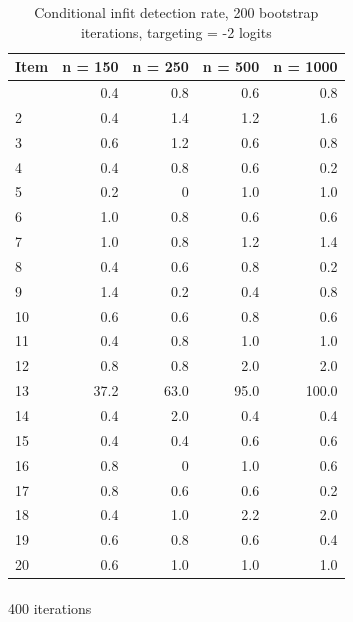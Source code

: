 \documentclass[
  letterpaper,
  DIV=11,
  numbers=noendperiod]{scrartcl}
\makeatletter
\let\oldparagraph\paragraph
\renewcommand{\paragraph}{
    \@ifstar
      \xxxParagraphStar
      \xxxParagraphNoStar
  }
\newcommand{\xxxParagraphStar}[1]{\oldparagraph*{#1}\mbox{}}
\newcommand{\xxxParagraphNoStar}[1]{\oldparagraph{#1}\mbox{}}
\makeatother
\begin{document}
\begin{longtable}[]{@{}lrrrr@{}}

\caption{\label{tbl-ifbresults2002}Conditional infit detection rate, 200
bootstrap iterations, targeting = -2 logits}

\tabularnewline

\toprule\noalign{}
Item & n = 150 & n = 250 & n = 500 & n = 1000 \\
\midrule\noalign{}
\endhead
\bottomrule\noalign{}
\endlastfoot
1 & 0.4 & 0.8 & 0.6 & 0.8 \\
2 & 0.4 & 1.4 & 1.2 & 1.6 \\
3 & 0.6 & 1.2 & 0.6 & 0.8 \\
4 & 0.4 & 0.8 & 0.6 & 0.2 \\
5 & 0.2 & 0 & 1.0 & 1.0 \\
6 & 1.0 & 0.8 & 0.6 & 0.6 \\
7 & 1.0 & 0.8 & 1.2 & 1.4 \\
8 & 0.4 & 0.6 & 0.8 & 0.2 \\
9 & 1.4 & 0.2 & 0.4 & 0.8 \\
10 & 0.6 & 0.6 & 0.8 & 0.6 \\
11 & 0.4 & 0.8 & 1.0 & 1.0 \\
12 & 0.8 & 0.8 & 2.0 & 2.0 \\
13 & 37.2 & 63.0 & 95.0 & 100.0 \\
14 & 0.4 & 2.0 & 0.4 & 0.4 \\
15 & 0.4 & 0.4 & 0.6 & 0.6 \\
16 & 0.8 & 0 & 1.0 & 0.6 \\
17 & 0.8 & 0.6 & 0.6 & 0.2 \\
18 & 0.4 & 1.0 & 2.2 & 2.0 \\
19 & 0.6 & 0.8 & 0.6 & 0.4 \\
20 & 0.6 & 1.0 & 1.0 & 1.0 \\

\end{longtable}

\paragraph{400 iterations}\label{iterations-2}
\end{document}
